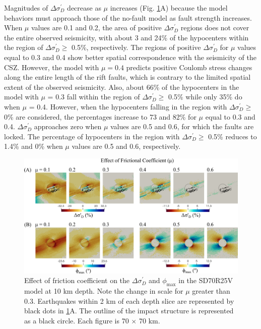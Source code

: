\documentclass[draft]{agujournal2018}
\begin{document}
Magnitudes of $\Delta \sigma_{D}^{\prime}$ decrease as $\mu$ increases (Fig. \ref{fig:eff_of_mu}A) because the model behaviors must approach those of the no-fault model as fault strength increases. When $\mu$ values are 0.1 and 0.2, the area of positive $\Delta\sigma_{D}^{\prime}$ regions does not cover the entire observed seismicity, with about 3 and 24\% of the hypocenters within the region of $\Delta\sigma_{D}^{\prime} \ge$ 0.5\%, respectively. The regions of positive $\Delta\sigma_{D}^{\prime}$ for $\mu$ values equal to 0.3 and 0.4 show better spatial correspondence with the seismicity of the CSZ. However, the model with $\mu = 0.4$ predicts positive Coulomb stress changes along the entire length of the rift faults, which is contrary to the limited spatial extent of the observed seismicity. Also, about 66\% of the hypocenters in the model with $\mu$ = 0.3 fall within the region of $\Delta\sigma_{D}^{\prime} \ge$ 0.5\% while only 35\% do when $\mu$ = 0.4. However, when the hypocenters falling in the region with $\Delta\sigma_{D}^{\prime} \ge$ 0\% are considered, the percentages increase to 73 and 82\% for $\mu$ equal to 0.3 and 0.4. 
$\Delta\sigma_{D}^{\prime}$ approaches zero when $\mu$ values are 0.5 and 0.6, for which the faults are locked. The percentage of hypocenters in the region with $\Delta\sigma_{D}^{\prime} \ge$ 0.5\% reduces to 1.4\% and 0\% when $\mu$ values are 0.5 and 0.6, respectively.

\begin{figure}[ht]
\centering
\includegraphics[width=30pc]{Figures/SD70R25V_2.png}
\caption{Effect of friction coefficient on the $\Delta\sigma_{D}^{\prime}$ and $\phi_{\max}$ in the SD70R25V model at 10 km depth. Note the change in scale for $\mu$ greater than 0.3. Earthquakes within 2 km of each depth slice are represented by black dots in \ref{fig:eff_of_mu}A. The outline of the impact structure is represented as a black circle. Each figure is 70 $\times$ 70 km.}
\label{fig:eff_of_mu}
\end{figure}
\end{document}

